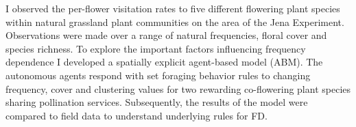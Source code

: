 I observed the per-flower visitation rates to five different flowering plant species within natural grassland plant communities on the area of the Jena Experiment. Observations were made over a range of natural frequencies, floral cover and species richness. To explore the important factors influencing frequency dependence I developed a spatially explicit agent-based model (ABM). The autonomous agents respond with set foraging behavior rules to changing frequency, cover and clustering values for two rewarding co-flowering plant species sharing pollination services. Subsequently, the results of the model were compared to field data to understand underlying rules for FD. 




%
%
%
%
%
%
